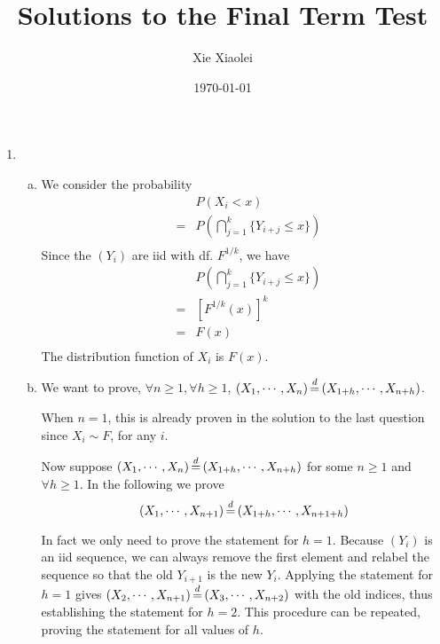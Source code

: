 \documentclass{report}
\author{Xie Xiaolei}
\date{\today}
\title{Solutions to the Final Term Test}
\begin{document}
\maketitle

\begin{enumerate}[1.]
\item
  \begin{enumerate}[(a)]
  \item We consider the probability
    \begin{eqnarray*}
      && P(X_i < x) \\
      &=& P(\bigcap_{j=1}^k \{Y_{i+j} \le x\}) \\
    \end{eqnarray*}
    Since the $(Y_i)$ are iid with df. $F^{1/k}$, we have
    \begin{eqnarray*}
      && P(\bigcap_{j=1}^k \{Y_{i+j} \le x\}) \\
      &=& [F^{1/k}(x)]^k \\
      &=& F(x) \\
    \end{eqnarray*}
    The distribution function of $X_i$ is $F(x)$.

  \item We want to prove, $\forall n \ge 1, \forall h \ge 1$, $(X_1,
    \cdots, X_n) \ed (X_{1+h}, \cdots, X_{n+h})$.

    When $n = 1$, this is already proven in the solution to the last
    question since $X_i \sim F$, for any $i$.

    Now suppose $(X_1, \cdots, X_n) \ed (X_{1+h}, \cdots, X_{n+h})$
    for some $n \ge 1$ and $\forall h \ge 1$. In the following we
    prove 
    \[
    (X_1, \cdots, X_{n+1}) \ed (X_{1+h}, \cdots, X_{n+1+h})
    \]
    
    In fact we only need to prove the statement for $h=1$. Because
    $(Y_i)$ is an iid sequence, we can always remove the first element
    and relabel the sequence so that the old $Y_{i+1}$ is the new
    $Y_{i}$. Applying the statement for $h=1$ gives $(X_2, \cdots,
    X_{n+1}) \ed (X_{3}, \cdots, X_{n+2})$ with the old indices,
    thus establishing the statement for $h=2$. This procedure can be
    repeated, proving the statement for all values of $h$.


\end{enumerate}
\end{enumerate}
\end{document}
